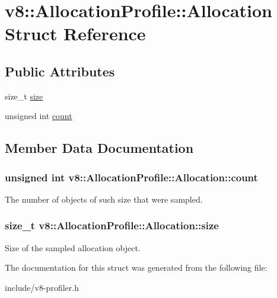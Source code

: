 \hypertarget{structv8_1_1_allocation_profile_1_1_allocation}{}\section{v8\+:\+:Allocation\+Profile\+:\+:Allocation Struct Reference}
\label{structv8_1_1_allocation_profile_1_1_allocation}
\subsection*{Public Attributes}
\begin{DoxyCompactItemize}
\item 
size\+\_\+t \hyperlink{structv8_1_1_allocation_profile_1_1_allocation_a346410fa5dfb796dff396069897c0aba}{size}
\item 
unsigned int \hyperlink{structv8_1_1_allocation_profile_1_1_allocation_a012fe5238f5ebec039d7832f2d3ae8ed}{count}
\end{DoxyCompactItemize}


\subsection{Member Data Documentation}
\subsubsection[{\texorpdfstring{count}{count}}]{\setlength{\rightskip}{0pt plus 5cm}unsigned int v8\+::\+Allocation\+Profile\+::\+Allocation\+::count}\hypertarget{structv8_1_1_allocation_profile_1_1_allocation_a012fe5238f5ebec039d7832f2d3ae8ed}{}\label{structv8_1_1_allocation_profile_1_1_allocation_a012fe5238f5ebec039d7832f2d3ae8ed}
The number of objects of such size that were sampled. 
\subsubsection[{\texorpdfstring{size}{size}}]{\setlength{\rightskip}{0pt plus 5cm}size\+\_\+t v8\+::\+Allocation\+Profile\+::\+Allocation\+::size}\hypertarget{structv8_1_1_allocation_profile_1_1_allocation_a346410fa5dfb796dff396069897c0aba}{}\label{structv8_1_1_allocation_profile_1_1_allocation_a346410fa5dfb796dff396069897c0aba}
Size of the sampled allocation object. 

The documentation for this struct was generated from the following file\+:\begin{DoxyCompactItemize}
\item 
include/v8-\/profiler.\+h\end{DoxyCompactItemize}
